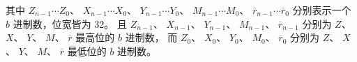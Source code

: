 \documentclass[main\_\_CN.tex]{subfiles}
\begin{document}
其中
\begin{math}Z_{n-1} \cdots Z_{0}\end{math}、
\begin{math}X_{n-1} \cdots X_{0}\end{math}、
\begin{math}Y_{n-1} \cdots Y_{0}\end{math}、
\begin{math}M_{n-1} \cdots M_{0}\end{math}、
\begin{math}\overline{r}_{n-1} \cdots \overline{r}_{0}\end{math}
分别表示一个 \begin{math}b\end{math} 进制数，位宽皆为 32。
且
\begin{math}Z_{n-1}\end{math}、
\begin{math}X_{n-1}\end{math}、
\begin{math}Y_{n-1}\end{math}、
\begin{math}M_{n-1}\end{math}、
\begin{math}\overline{r}_{n-1}\end{math}
分别为
\begin{math}Z\end{math}、
\begin{math}X\end{math}、
\begin{math}Y\end{math}、
\begin{math}M\end{math}、
\begin{math}\overline{r}\end{math}
最高位的 \begin{math}b\end{math} 进制数，
而
\begin{math}Z_{0}\end{math}、
\begin{math}X_{0}\end{math}、
\begin{math}Y_{0}\end{math}、
\begin{math}M_{0}\end{math}、
\begin{math}\overline{r}_{0}\end{math}
分别为
\begin{math}Z\end{math}、
\begin{math}X\end{math}、
\begin{math}Y\end{math}、
\begin{math}M\end{math}、
\begin{math}\overline{r}\end{math}
最低位的 \begin{math}b\end{math} 进制数。
\end{document}
